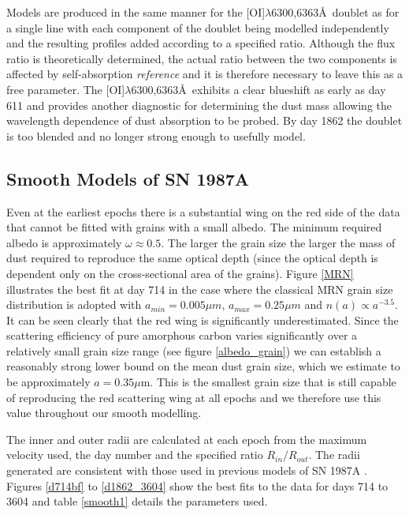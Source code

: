 \documentclass[useAMS,usenatbib,usegraphicx]{mnras}
\begin{document}
Models are produced in the same manner for the [OI]$\lambda$6300,6363\AA\ doublet as for a single line with each component of the doublet being modelled independently and the resulting profiles added according to a specified ratio.  Although the flux ratio is theoretically determined, the actual ratio between the two components is affected by self-absorption \textit{reference} and it is therefore necessary to leave this as a free parameter.  The [OI]$\lambda$6300,6363\AA\ exhibits a clear blueshift as early as day 611 and provides another diagnostic for determining the dust mass allowing the wavelength dependence of dust absorption to be probed.  By day 1862 the doublet is too blended and no longer strong enough to usefully model. 





\subsection{Smooth Models of SN 1987A}
\label{smooth_models}

Even at the earliest epochs there is a substantial wing on the red side of the data that cannot be fitted with grains with a small albedo.  The minimum required albedo is approximately $\omega \approx 0.5$.  The larger the grain size the larger the mass of dust required to reproduce the same optical depth (since the optical depth is dependent only on the cross-sectional area of the grains).  Figure \ref{MRN} illustrates the best fit at day 714 in the case where the classical MRN grain size distribution is adopted with $a_{min}=0.005 \mu m$, $a_{max}=0.25 \mu m$ and $n(a) \propto a^{-3.5}$.  It can be seen clearly that the red wing is significantly underestimated.  Since the scattering efficiency of pure amorphous carbon varies significantly over a relatively small grain size range (see figure \ref{albedo_grain}) we can establish a reasonably strong lower bound on the mean dust grain size, which we estimate to be approximately $a=0.35\mu$m.  This is the smallest grain size that is still capable of reproducing the red scattering wing at all epochs and we therefore use this value throughout our smooth modelling.  

The inner and outer radii are calculated at each epoch from the maximum velocity used, the day number and the specified ratio $R_{in}/R_{out}$.  The radii generated are consistent with those used in previous models of SN 1987A \citep{Wesson2015,Ercolano2007}.  Figures \ref{d714bf} to \ref{d1862_3604} show the best fits to the data for days 714 to 3604 and table \ref{smooth1} details the parameters used.
\end{document}
